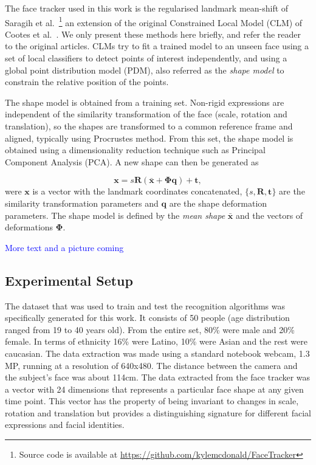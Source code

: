 \documentclass[]{article}
\begin{document}
The face tracker used in this work is the regularised landmark
mean-shift of Saragih et
al.~\cite{saragih2011deformable}\footnote{Source code is available at
  \url{https://github.com/kylemcdonald/FaceTracker}} an extension of
the original Constrained Local Model (CLM) of Cootes et
al.~\cite{cristinacce2006feature}. We only present these methods here
briefly, and refer the reader to the original articles. CLMs try to
fit a trained model to an unseen face using a set of local classifiers
to detect points of interest independently, and using a global point
distribution model (PDM), also referred as the \textit{shape model} to
constrain the relative position of the points.

The shape model is obtained from a training set. Non-rigid expressions
are independent of the similarity transformation of the face (scale,
rotation and translation), so the shapes are transformed
to a common reference frame and aligned, typically using Procrustes
method. From this set, the shape model is obtained using a
dimensionality reduction technique such as Principal Component
Analysis (PCA). A new shape can then be generated as

\begin{equation}
  \label{eq:shape_model}
  \mathbf{x} = s\mathbf{R}(\bar{\mathbf{x}} +
  \boldsymbol{\Phi}\mathbf{q}) + \mathbf{t},
\end{equation}
were $\mathbf{x}$ is a vector with the landmark coordinates concatenated, 
$\{s,\mathbf{R},\mathbf{t}\}$ are the similarity transformation
parameters and $\mathbf{q}$ are the shape deformation parameters. The
shape model is defined by the \textit{mean shape} $\mathbf{\bar{x}}$
and the vectors of deformations $\boldsymbol{\Phi}$.

\textcolor{blue}{More text and a picture coming}



\subsection{Experimental Setup}
The dataset that was used to train and test the recognition algorithms was specifically generated for this work. It
consists of 50 people (age distribution ranged from 19 to 40 years old). From the entire set, 80\% were male and 20\%
female. In terms of ethnicity 16\% were Latino, 10\% were Asian and the rest were caucasian. The data extraction was
made using a standard notebook webcam, 1.3 MP, running at a resolution of 640x480.
The distance between the camera and the subject's face was about 114cm. The data extracted from the face tracker was a
vector with 24 dimensions that represents a particular face shape at any given time point. This vector has the property
of being invariant to changes in scale, rotation and translation but provides a distinguishing signature for different
facial expressions and facial identities.
\end{document}
